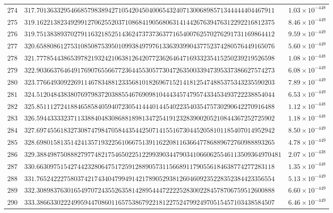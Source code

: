 \documentclass[12pt,reqno]{amsart}
\theoremstyle{remark}
\begin{document}
\begin{longtable}{clc}
$274$ & $317.7013633295466857983894271054204504006543240713006898571344444404467911$ & $1.03\times 10^{-448}$ \\
$275$ & $319.1622138234929912706255203710868419056806314144267639476312292216812375$ & $8.46\times 10^{-449}$ \\
$276$ & $319.7513838937027911632185251436247373736377165400762570276291731169864412$ & $9.59\times 10^{-449}$ \\
$277$ & $320.6588086127531085087539501099384979761336393990437752374280576449165076$ & $5.60\times 10^{-449}$ \\
$278$ & $321.7778544386539782193242106381264207723626464716933235415250239219526598$ & $1.08\times 10^{-448}$ \\
$279$ & $322.9036637646491769076556677236445530577304726350033947395337386627574273$ & $6.08\times 10^{-449}$ \\
$280$ & $323.7766493092269114678348812335681018269671521418125474885375343235590203$ & $7.89\times 10^{-449}$ \\
$281$ & $324.5120484383807697983720388554676909810444345747957433453493722238854044$ & $6.53\times 10^{-449}$ \\
$282$ & $325.8511127241884658584059407230541444014454022354035475730290642270916488$ & $1.12\times 10^{-448}$ \\
$283$ & $326.5944333323711338840483086881898134725419123283900205210844367252725902$ & $1.18\times 10^{-448}$ \\
$284$ & $327.6974556183273087479847058443544250714155167304452058101185407014952942$ & $8.50\times 10^{-449}$ \\
$285$ & $328.6980158135142413571932256106675139116220811636647786889672760988893265$ & $4.78\times 10^{-449}$ \\
$286$ & $329.388498750888279774821754650225122993903447903410660625546113509364970481$ & $2.07\times 10^{-438}$ \\
$287$ & $330.6630975154274423280647517259128890573115668911790556184638774277283118$ & $1.35\times 10^{-448}$ \\
$288$ & $331.7652422275803742174340479949142178905293812604609235228352384423356554$ & $5.13\times 10^{-449}$ \\
$289$ & $332.3089837630165497072435526358142895444722225283002284578706759512600888$ & $6.60\times 10^{-449}$ \\
$290$ & $333.3866330222499594470860116575386792218122752479924970515457103438584507$ & $6.46\times 10^{-449}$ \\

\end{longtable}
\end{document}
